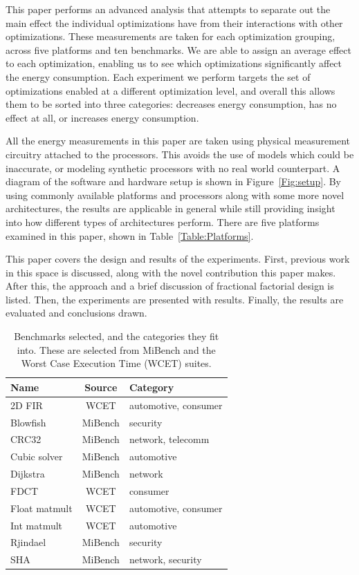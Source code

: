\documentclass[twocolumn]{article}
\let\oldcaption\caption
\renewcommand{\caption}[1]{\oldcaption{\textup{#1}}}
\begin{document}
This paper performs an advanced analysis that attempts to separate out the main effect the individual optimizations have from their interactions with other optimizations. These measurements are taken for each optimization grouping, across five platforms and ten benchmarks. We are able to assign an average effect to each optimization, enabling us to see which optimizations significantly affect the energy consumption. Each experiment we perform targets the set of optimizations enabled at a different optimization level, and overall this allows them to be sorted into three categories: decreases energy consumption, has no effect at all, or increases energy consumption.

All the energy measurements in this paper are taken using physical measurement circuitry attached to the processors. This avoids the use of models which could be inaccurate, or modeling synthetic processors with no real world counterpart. A diagram of the software and hardware setup is shown in Figure~\ref{Fig:setup}. By using commonly available platforms and processors along with some more novel architectures, the results are applicable in general while still providing insight into how different types of architectures perform. There are five platforms examined in this paper, shown in Table~\ref{Table:Platforms}.

This paper covers the design and results of the experiments. First, previous work in this space is discussed, along with the novel contribution this paper makes. After this, the approach and a brief discussion of fractional factorial design is listed. Then, the experiments are presented with results. Finally, the results are evaluated and conclusions drawn.


\begin{table}[t]
	\centering
	\begin{tabular}{l c l}
	\textbf{Name}			& \textbf{Source} 	& \textbf{Category} \\
	\hline
	2D FIR					& WCET 		& automotive, consumer	\\
	Blowfish				& MiBench 	& security	\\
	CRC32					& MiBench 	& network, telecomm	\\
	Cubic solver			& MiBench 	& automotive	\\
	Dijkstra				& MiBench 	& network	\\
	FDCT					& WCET 		& consumer	\\
	Float matmult			& WCET 		& automotive, consumer	\\
	Int matmult				& WCET	 	& automotive	\\
	Rjindael				& MiBench 	& security	\\
	SHA						& MiBench 	& network, security	\\
	\end{tabular}
\caption{Benchmarks selected, and the categories they fit into. These are selected from MiBench\cite{MiBench} and the Worst Case Execution Time (WCET)\cite{WCET} suites.}
\label{Table:Benchmarks}
\end{table}
\end{document}
